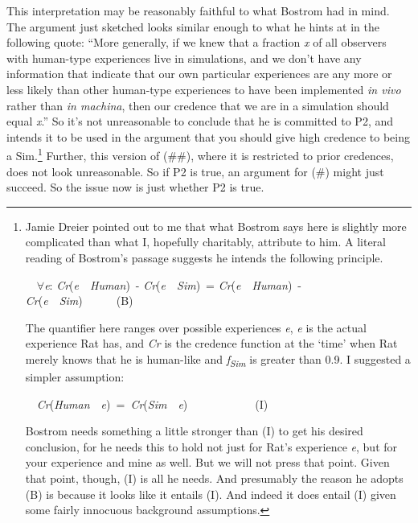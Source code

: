 \noindent This interpretation may be reasonably faithful to what Bostrom had in mind. The argument just sketched looks similar enough to what he hints at in the following quote: ``More generally, if we knew that a fraction \textit{x} of all observers with human-type experiences live in simulations, and we don't have any information that indicate that our own particular experiences are any more or less likely than other human-type experiences to have been implemented \textit{in vivo }rather than \textit{in machina}, then our credence that we are in a simulation should equal \textit{x}.'' So it's not unreasonable to conclude that he is committed to P2, and intends it to be used in the argument that you should give high credence to being a Sim.\footnote{ Jamie Dreier pointed out to me that what Bostrom says here is slightly more complicated than what I, hopefully charitably, attribute to him. A literal reading of Bostrom's passage suggests he intends the following principle.\par \par \ \ ${\forall}$\textit{e}: \textit{Cr}(\textit{e}\textsuperscript{}~{\textbar}~\textit{Human})~- \textit{Cr}(\textit{e}\textsuperscript{}~{\textbar}~\textit{Sim})~= \textit{Cr}(\textit{e}~{\textbar}~\textit{Human})~- \textit{Cr}(\textit{e}~{\textbar}~\textit{Sim})\ \ \ \ \ \ (B)\par \par The quantifier here ranges over possible experiences \textit{e}, \textit{e}\textsuperscript{} is the actual experience Rat has, and \textit{Cr} is the credence function at the {\textquoteleft}time' when Rat merely knows that he is human\nobreakdash-like and \textit{f}\textit{\textsubscript{Sim}} is greater than 0.9. I suggested a simpler assumption:\par \par \ \ \textit{Cr}(\textit{Human}~{\textbar}~\textit{e}\textsuperscript{})~=~\textit{Cr}(\textit{Sim}~{\textbar}~\textit{e}\textsuperscript{})\ \ \ \ \ \ \ \ \ \ \ \ (I)\par \par Bostrom needs something a little stronger than (I) to get his desired conclusion, for he needs this to hold not just for Rat's experience \textit{e}\textsuperscript{}, but for your experience and mine as well. But we will not press that point. Given that point, though, (I) is all he needs. And presumably the reason he adopts (B) is because it looks like it entails (I). And indeed it does entail (I) given some fairly innocuous background assumptions. } Further, this version of (\#\#), where it is restricted to prior credences, does not look unreasonable. So if P2 is true, an argument for (\#) might just succeed. So the issue now is just whether P2 is true.

